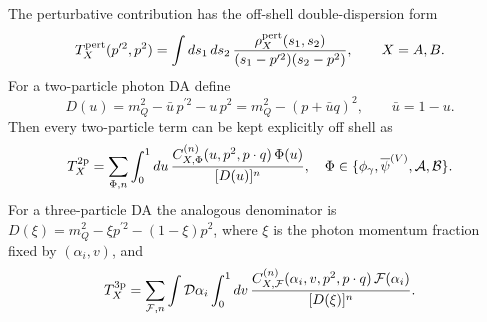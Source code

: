 \documentclass[11pt]{article}
\begin{document}
The perturbative contribution has the off-shell double-dispersion form
\begin{equation}
 T_X^{\rm pert}(p^{\prime2},p^2)
 =\int ds_1\,ds_2\,
 \frac{\rho_X^{\rm pert}(s_1,s_2)}
 {(s_1-p^{\prime2})(s_2-p^2)},\qquad X=A,B.
 \label{eq:preborel-double-dispersion}
\end{equation}
For a two-particle photon DA define
\begin{equation}
 D(u)=m_Q^2-\bar u\,p^{\prime2}-u\,p^2
     =m_Q^2-(p+\bar u q)^2,\qquad \bar u=1-u.
 \label{eq:two-particle-denominator}
\end{equation}
Then every two-particle term can be kept explicitly off shell as
\begin{equation}
 T_X^{\rm 2p}
 =\sum_{\Phi,n}\int_0^1du\,
 \frac{C_{X,\Phi}^{(n)}(u,p^2,p\cdot q)\,\Phi(u)}
 {[D(u)]^n},
 \quad
 \Phi\in\{\phi_\gamma,\overline\psi^{(V)},\mathcal A,\mathcal B\}.
 \label{eq:preborel-two-particle-master}
\end{equation}
For a three-particle DA the analogous denominator is
$D(\xi)=m_Q^2-\xi p^{\prime2}-(1-\xi)p^2$, where $\xi$ is the photon momentum
fraction fixed by $(\alpha_i,v)$, and
\begin{equation}
 T_X^{\rm 3p}
 =\sum_{\mathcal F,n}\int\mathcal D\alpha_i\int_0^1dv\,
 \frac{C_{X,\mathcal F}^{(n)}
 (\alpha_i,v,p^2,p\cdot q)\,\mathcal F(\alpha_i)}
 {[D(\xi)]^n}.
 \label{eq:preborel-three-particle-master}
\end{equation}
\end{document}
